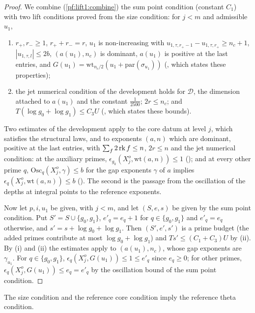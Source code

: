 \begin{proof}
We combine (\cref{pf:lift1:combine}) the sum point condition (constant $C_1$) with two lift conditions
proved from the size condition: for $j<m$ and admissible $u_1$,
\begin{enumerate}[label=(\roman*)]
\item $r_+,r_-\ge1$, $r_++r_-=r$, $u_1$ is non-increasing with $u_{1,\tau,r_+-1}-u_{1,\tau,r_+}\ge n_c+1$,
  $|u_{1,\tau,l}|\le2b$, $(a(u_1),n_c)$ is dominant, $a(u_1)$ is positive at the last entries, and
  $G(u_1)=\mathrm{wt}_{n_c/2}(u_1+\mathrm{par}(\sigma_{u_1}))$
  (, which states these properties);
\item the jet numerical condition of the development holds for $\mathcal D$, the dimension attached to
  $a(u_1)$ and the constant $\frac1{2500}$; $2r\le n_c$; and $T(\log g_0+\log g_1)\le C_3U$
  (, which states these bounds).
\end{enumerate}
Two estimates of the development apply to the core datum at level $j$, which satisfies the structural
laws, and to exponents $(a,n)$ which are dominant, positive at the last entries, with
$\sum_f2\operatorname{rk} f\le n$, $2r\le n$ and the jet numerical condition: at the auxiliary primes,
$\epsilon_{g_k}(X^o_j,\mathrm{wt}(a,n))\le1$
(); and at every other
prime $q$, $\mathrm{Osc}_q(X^o_j,\gamma)\le b$ for the gap exponents $\gamma$ of $a$ implies
$\epsilon_q(X^o_j,\mathrm{wt}(a,n))\le b$
(). The second is the passage
from the oscillation of the depths at integral points to the reference exponents.

Now let $p,i,u_1$ be given, with $j<m$, and let $(S,e,s)$ be given by the sum point condition. Put
$S'=S\cup\{g_0,g_1\}$, $e'_q=e_q+1$ for $q\in\{g_0,g_1\}$ and $e'_q=e_q$ otherwise, and
$s'=s+\log g_0+\log g_1$. Then $(S',e',s')$ is a prime budget (the added primes contribute at most
$\log g_0+\log g_1$) and $Ts'\le(C_1+C_3)U$ by (ii). By (i) and (ii) the estimates apply to
$(a(u_1),n_c)$, whose gap exponents are $\gamma_{u_1}$. For $q\in\{g_0,g_1\}$,
$\epsilon_q(X^o_j,G(u_1))\le1\le e'_q$ since $e_q\ge0$; for other primes,
$\epsilon_q(X^o_j,G(u_1))\le e_q=e'_q$ by the oscillation bound of the sum point condition.
\end{proof}

\begin{lemma}\label{pf:lift1:reftheta}
The size condition and the reference core condition imply the reference theta condition.
\end{lemma}

